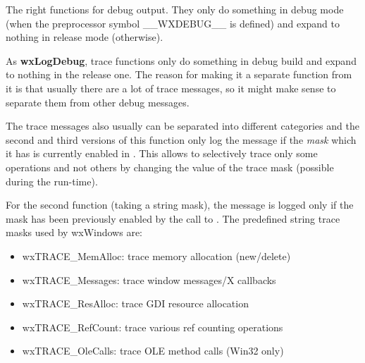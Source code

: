 

The right functions for debug output. They only do something in debug
mode (when the preprocessor symbol \_\_WXDEBUG\_\_ is defined) and expand to
nothing in release mode (otherwise).

\label{wxlogtrace}







As {\bf wxLogDebug}, trace functions only do something in debug build and
expand to nothing in the release one. The reason for making
it a separate function from it is that usually there are a lot of trace
messages, so it might make sense to separate them from other debug messages.

The trace messages also usually can be separated into different categories and
the second and third versions of this function only log the message if the
{\it mask} which it has is currently enabled in . This
allows to selectively trace only some operations and not others by changing
the value of the trace mask (possible during the run-time).

For the second function (taking a string mask), the message is logged only if
the mask has been previously enabled by the call to
. The predefined string trace masks
used by wxWindows are:

\begin{itemize}\itemsep=0pt
\item wxTRACE\_MemAlloc: trace memory allocation (new/delete)
\item wxTRACE\_Messages: trace window messages/X callbacks
\item wxTRACE\_ResAlloc: trace GDI resource allocation
\item wxTRACE\_RefCount: trace various ref counting operations
\item wxTRACE\_OleCalls: trace OLE method calls (Win32 only)
\end{itemize}

